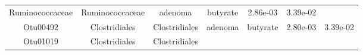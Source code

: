 \documentclass[11pt,]{article}
\begin{document}
\begin{longtable}[]{@{}ccccccc@{}}
\begin{minipage}[t]{0.17\columnwidth}
Ruminococcaceae\strut
\end{minipage} & \begin{minipage}[t]{0.17\columnwidth}\centering\strut
Ruminococcaceae\strut
\end{minipage} & \begin{minipage}[t]{0.09\columnwidth}\centering\strut
adenoma\strut
\end{minipage} & \begin{minipage}[t]{0.11\columnwidth}\centering\strut
butyrate\strut
\end{minipage} & \begin{minipage}[t]{0.09\columnwidth}\centering\strut
2.86e-03\strut
\end{minipage} & \begin{minipage}[t]{0.09\columnwidth}\centering\strut
3.39e-02\strut
\end{minipage}\tabularnewline
\begin{minipage}[t]{0.09\columnwidth}\centering\strut
Otu00492\strut
\end{minipage} & \begin{minipage}[t]{0.17\columnwidth}\centering\strut
Clostridiales\strut
\end{minipage} & \begin{minipage}[t]{0.17\columnwidth}\centering\strut
Clostridiales\strut
\end{minipage} & \begin{minipage}[t]{0.09\columnwidth}\centering\strut
adenoma\strut
\end{minipage} & \begin{minipage}[t]{0.11\columnwidth}\centering\strut
butyrate\strut
\end{minipage} & \begin{minipage}[t]{0.09\columnwidth}\centering\strut
2.80e-03\strut
\end{minipage} & \begin{minipage}[t]{0.09\columnwidth}\centering\strut
3.39e-02\strut
\end{minipage}\tabularnewline
\begin{minipage}[t]{0.09\columnwidth}\centering\strut
Otu01019\strut
\end{minipage} & \begin{minipage}[t]{0.17\columnwidth}\centering\strut
Clostridiales\strut
\end{minipage} & \begin{minipage}[t]{0.17\columnwidth}\centering\strut
Clostridiales\strut
\end{minipage} & \begin{minipage}[t]{0.09\columnwidth}\centering\strut

\end{minipage}
\end{longtable}
\end{document}
